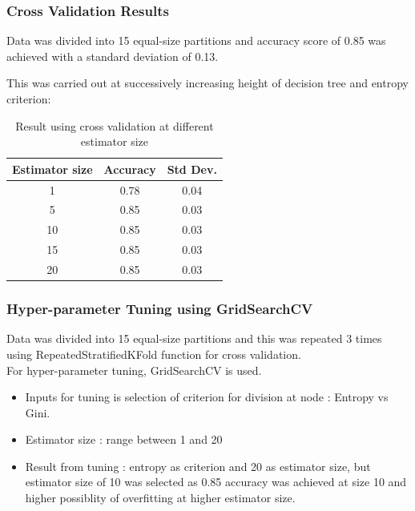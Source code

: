 \documentclass[12pt, letter]{article}
\begin{document}
\pagebreak

\subsubsection{Cross Validation Results}

Data was divided into 15 equal-size partitions and accuracy score of 0.85 was achieved with a standard deviation of 0.13. 

This was carried out at successively increasing height of decision tree and entropy criterion: \\

\begin{table}[h]
\centering
\caption{Result using cross validation at different estimator size}
\label{tab:my_label}
\begin{tabular}{c|c|c}
\hline
Estimator size & Accuracy & Std Dev. \\
\hline
\midrule
1 & 0.78 & 0.04 \\
5 & 0.85 & 0.03 \\
10 & 0.85 & 0.03 \\
15 & 0.85 & 0.03 \\
20 & 0.85 & 0.03 \\ 
\hline    
\end{tabular}
\end{table}

\subsubsection{Hyper-parameter Tuning using GridSearchCV}
Data was divided into 15 equal-size partitions and this was repeated 3 times using RepeatedStratifiedKFold function for cross validation. \\

For hyper-parameter tuning, GridSearchCV is used. \\
\begin{itemize}
    \item Inputs for tuning is selection of criterion for division at node : Entropy vs Gini. 
    \item Estimator size : range between 1 and 20 
    \item Result from tuning : entropy as criterion and 20 as estimator size, but estimator size of 10 was selected as 0.85 accuracy was achieved at size 10 and higher possiblity of overfitting at higher estimator size. 
\end{itemize}
\end{document}
